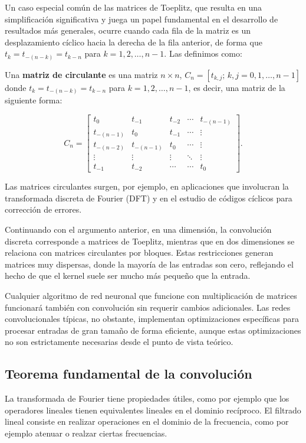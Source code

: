 Un caso especial común de las matrices de Toeplitz, que resulta en una simplificación significativa y juega un papel fundamental en el desarrollo de resultados más generales, ocurre cuando cada fila de la matriz es un desplazamiento cíclico hacia la derecha de la fila anterior, de forma que $t_k = t_{-(n-k)} = t_{k-n}$ para $k = 1, 2, \ldots, n-1$. Las definimos como:
\begin{definicion}
Una \textbf{matriz de circulante} es una matriz $n \times n$,  $C_n = [t_{k,j}; \, k, j = 0, 1, \ldots, n-1]$  donde $t_k = t_{-(n-k)} = t_{k-n}$ para $k = 1, 2, \ldots, n-1$, es decir, una matriz de la siguiente forma:

\begin{equation}
C_n = 
\begin{bmatrix}
t_0 & t_{-1} & t_{-2} & \cdots & t_{-(n-1)} \\
t_{-(n-1)} & t_0 & t_{-1} & \cdots & \vdots \\
t_{-(n-2)} & t_{-(n-1)} & t_0 & \cdots & \vdots \\
\vdots & \vdots & \vdots & \ddots & \vdots \\
t_{-1} & t_{-2} & \cdots & \cdots & t_0
\end{bmatrix}.
\end{equation}
\end{definicion}

Las matrices circulantes surgen, por ejemplo, en aplicaciones que involucran la transformada discreta de Fourier (DFT) y en el estudio de códigos cíclicos para corrección de errores.




Continuando con el argumento anterior, en una dimensión, la convolución discreta corresponde a matrices de Toeplitz, mientras que en dos dimensiones se relaciona con matrices circulantes por bloques. Estas restricciones generan matrices muy dispersas, donde la mayoría de las entradas son cero, reflejando el hecho de que el kernel suele ser mucho más pequeño que la entrada.  

Cualquier algoritmo de red neuronal que funcione con multiplicación de matrices funcionará también con convolución sin requerir cambios adicionales. Las redes convolucionales típicas, no obstante, implementan optimizaciones específicas para procesar entradas de gran tamaño de forma eficiente, aunque estas optimizaciones no son estrictamente necesarias desde el punto de vista teórico.


\subsection{Teorema fundamental de la convolución}
La transformada de Fourier tiene propiedades útiles, como por ejemplo que los operadores lineales tienen equivalentes lineales en el dominio recíproco. El filtrado lineal consiste en realizar operaciones en el dominio de la frecuencia, como por ejemplo atenuar o realzar ciertas frecuencias.

